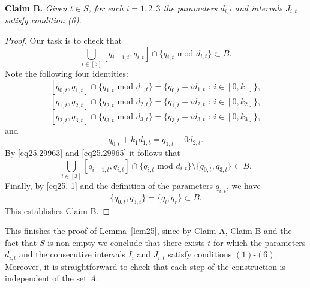 \documentclass[12pt,reqno]{amsart}
\theoremstyle{definition}
\begin{document}
\vspace{10pt}
{\bf Claim B. }{\em  Given $t\in S$, for each $i=1,2,3$ the parameters $d_{i,t}$ and intervals $J_{i,t}$ satisfy condition (6).
}

\begin{proof}
Our task is to check that
\[
\bigcup_{i\in[3]} [q_{i-1,t},q_{i,t}] \cap \{q_{i,t} \text{ mod } d_{i,t} \} \subset B.
\]
Note the following four identities:
\[
[q_{0,t}, q_{1,t}] \cap \{q_{1,t} \text{ mod } d_{1,t}\}= \{q_{0,t} + id_{1,t} \text{ : }i \in [0,k_1] \},
\]
\[
[q_{1,t},q_{2,t}] \cap \{q_{2,t} \text{ mod } d_{2,t}\}= \{q_{1,t} + id_{2,t} \text{ : }i \in [0,k_2] \},
\]
\[
[q_{2,t},q_{3,t}] \cap \{q_{3,t} \text{ mod } d_{3,t}\}= \{q_{3,t} - id_{3,t} \text{ : }i \in [0,k_3] \},
\]
and
\[
q_{0,t}+k_1d_{1,t}=q_{1,t}+0d_{2,t}.
\]
By \eqref{eq25.29963} and \eqref{eq25.29965} it follows that
$$ \bigcup_{i\in[3]} [q_{i-1,t},q_{i,t}] \cap \{q_{i,t} \text{ mod } d_{i,t} \} \setminus \{q_{0,t}, q_{3,t}\} \subset B.$$
Finally, by  \eqref{eq25.-1} and the definition of the parameters $q_{i,t}$, we have
\[
\{q_{0,t}, q_{3,t}\}=\{q_l,q_r\} \subset B.
\]
This establishes Claim B.
\end{proof}

\vspace{5pt}
This finishes the proof of Lemma~\ref{lem25}, since 
by Claim A, Claim B and the fact that $S$ is non-empty we conclude that there exists $t$ for which the parameters $d_{i,t}$ and the consecutive intervals $I_i$ and $J_{i,t}$
satisfy conditions $(1)$-$(6)$. Moreover, it is straightforward to check that each step of the construction is independent of the set $A$.
\end{document}
